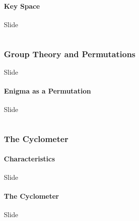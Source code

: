 \documentclass[hyphens,aspectratio=169]{beamer}
\begin{document}
\subsection{Key Space}

\begin{frame}[fragile]{Slide}
\end{frame}

\part{}

\section{Group Theory and Permutations}

\begin{frame}[fragile]{Slide}
\end{frame}

\subsection{Enigma as a Permutation}

\begin{frame}[fragile]{Slide}
\end{frame}

\part{}
\section{The Cyclometer}

\subsection{Characteristics}
\begin{frame}[fragile]{Slide}
\end{frame}

\subsection{The Cyclometer}
\begin{frame}[fragile]{Slide}
\end{frame}

\part{}
\end{document}
